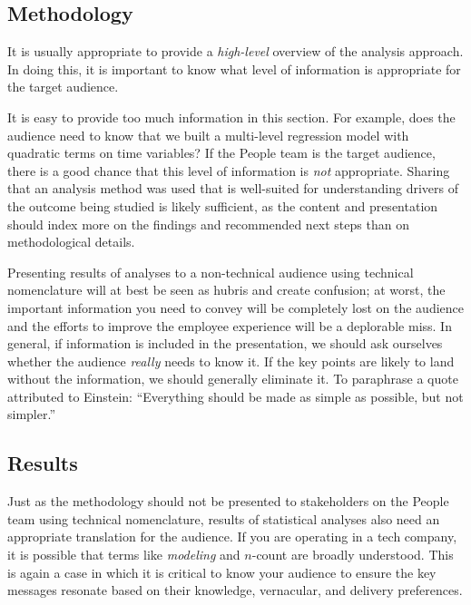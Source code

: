 \documentclass[
]{book}
\begin{document}
\hypertarget{methodology}{%
\subsection{Methodology}\label{methodology}}

It is usually appropriate to provide a \emph{high-level} overview of the analysis approach. In doing this, it is important to know what level of information is appropriate for the target audience.

It is easy to provide too much information in this section. For example, does the audience need to know that we built a multi-level regression model with quadratic terms on time variables? If the People team is the target audience, there is a good chance that this level of information is \emph{not} appropriate. Sharing that an analysis method was used that is well-suited for understanding drivers of the outcome being studied is likely sufficient, as the content and presentation should index more on the findings and recommended next steps than on methodological details.

Presenting results of analyses to a non-technical audience using technical nomenclature will at best be seen as hubris and create confusion; at worst, the important information you need to convey will be completely lost on the audience and the efforts to improve the employee experience will be a deplorable miss. In general, if information is included in the presentation, we should ask ourselves whether the audience \emph{really} needs to know it. If the key points are likely to land without the information, we should generally eliminate it. To paraphrase a quote attributed to Einstein: ``Everything should be made as simple as possible, but not simpler.''

\hypertarget{results}{%
\subsection{Results}\label{results}}

Just as the methodology should not be presented to stakeholders on the People team using technical nomenclature, results of statistical analyses also need an appropriate translation for the audience. If you are operating in a tech company, it is possible that terms like \emph{modeling} and \(n\)-count are broadly understood. This is again a case in which it is critical to know your audience to ensure the key messages resonate based on their knowledge, vernacular, and delivery preferences.
\end{document}
